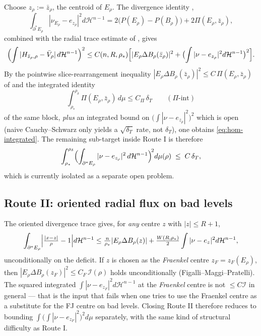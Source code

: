 \documentclass[11pt]{article}
\theoremstyle{definition}
\newcommand{\rstar}{\rho_{*}}
\newcommand{\rdel}{\rho_\delta}
\newcommand{\Hn}{\mathcal H^{n-1}}
\begin{document}
Choose $z_\rho:=\bar z_\rho$, the centroid of $E_\rho$.  The
divergence identity \cite[Eq.~(5.3$'$)]{SpaceTimeIdentity},
\[
   \int_{\partial^{*}E_\rho}|\nu_{E_\rho}-e_{z_\rho}|^{2}d\Hn
   =2\bigl(P(E_\rho)-P(B_\rho)\bigr)+2\Pi(E_\rho,\bar z_\rho),
\]
combined with the radial trace estimate of
\cite[Thm.~2.2]{FJCenterBridge}, gives
\begin{equation}\label{eq:hom-via-Pi}
   \Bigl(\int|H_{\bar z_\rho,\rho}-\bar V_\rho|\,d\Hn\Bigr)^{2}
   \le C(n,R,\rstar)\Bigl[|E_\rho\Delta B_\rho(\bar z_\rho)|^{2}
   +\bigl(\int|\nu-e_{z_\rho}|^{2}d\Hn\bigr)^{2}\Bigr].
\end{equation}
By the pointwise slice-rearrangement inequality
$|E_\rho\Delta B_\rho(\bar z_\rho)|^{2}\le C\,\Pi(E_\rho,\bar z_\rho)$
of \cite[Lem.~4.3]{SpaceTimeIdentity} and the integrated
identity
\[
   \int_{\rstar}^{\rdel}\Pi(E_\rho,\bar z_\rho)\,d\mu
   \le C_\Pi\,\delta_T \qquad (\Pi\text{-int})
\]
of the same block, \emph{plus} an integrated bound on
$\bigl(\int|\nu-e_{z_\rho}|^{2}\bigr)^{2}$ which is open
(naive Cauchy--Schwarz only yields a $\sqrt{\delta_T}$ rate, not
$\delta_T$), one obtains \eqref{eq:hom-integrated}.  The remaining
sub-target inside Route I is therefore
\[
   \int_{\rstar}^{\rdel}\Bigl(\int_{\partial^{*}E_\rho}|\nu-e_{z_\rho}|^{2}\,d\Hn\Bigr)^{\!2}d\mu(\rho)
   \;\le\;C\,\delta_T,
\]
which is currently isolated as a separate open problem.

\subsection{Route II: oriented radial flux on bad levels}

The oriented divergence trace
\cite[Thm.~2.1]{FJCenterBridge} gives, for \emph{any} centre $z$
with $|z|\le R+1$,
\[
   \int_{\partial^{*}E_\rho}\Bigl|\tfrac{|x-z|}{\rho}-1\Bigr|d\Hn
   \le\tfrac{n}{\rstar}|E_\rho\Delta B_\rho(z)|
   +\tfrac{W(R,\rstar)}{2}\int|\nu-e_z|^{2}d\Hn,
\]
unconditionally on the deficit.  If $z$ is chosen as the
\emph{Fraenkel} centre $z_F=z_F(E_\rho)$, then
$|E_\rho\Delta B_\rho(z_F)|^{2}\le C_F\,\mathcal I(\rho)$ holds
unconditionally (Figalli--Maggi--Pratelli).  The squared integrated
$\int|\nu-e_{z_F}|^{2}d\Hn$ at the \emph{Fraenkel} centre is not
$\le C\mathcal I$ in general — that is the input that fails when one
tries to use the Fraenkel centre as a substitute for the FJ centre
on bad levels.  Closing Route II therefore reduces to bounding
$\int\bigl(\int|\nu-e_{z_F}|^{2}\bigr)^{2}d\mu$ separately, with
the same kind of structural difficulty as Route I.
\end{document}
